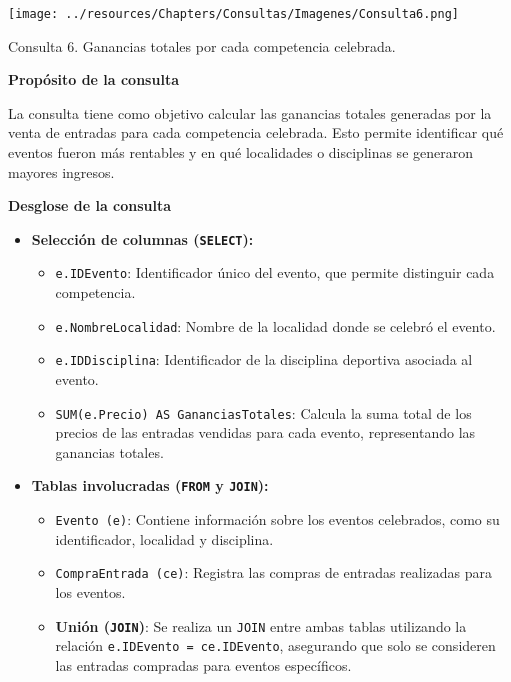 \begin{center}
    \texttt{[image: ../resources/Chapters/Consultas/Imagenes/Consulta6.png]} 
    
   Consulta 6. Ganancias totales por cada competencia celebrada.
\end{center}

\textbf{Propósito de la consulta}

La consulta tiene como objetivo calcular las ganancias totales generadas por la venta de entradas para cada competencia celebrada. Esto permite identificar qué eventos fueron más rentables y en qué localidades o disciplinas se generaron mayores ingresos.

\textbf{Desglose de la consulta}

\begin{itemize}
   \item \textbf{Selección de columnas (\texttt{SELECT}):}
   \begin{itemize}
       \item \texttt{e.IDEvento}: Identificador único del evento, que permite distinguir cada competencia.
       \item \texttt{e.NombreLocalidad}: Nombre de la localidad donde se celebró el evento.
       \item \texttt{e.IDDisciplina}: Identificador de la disciplina deportiva asociada al evento.
       \item \texttt{SUM(e.Precio) AS GananciasTotales}: Calcula la suma total de los precios de las entradas vendidas para cada evento, representando las ganancias totales.
   \end{itemize}

   \item \textbf{Tablas involucradas (\texttt{FROM} y \texttt{JOIN}):}
   \begin{itemize}
       \item \texttt{Evento (e)}: Contiene información sobre los eventos celebrados, como su identificador, localidad y disciplina.
       \item \texttt{CompraEntrada (ce)}: Registra las compras de entradas realizadas para los eventos.
       \item \textbf{Unión (\texttt{JOIN})}: Se realiza un \texttt{JOIN} entre ambas tablas utilizando la relación \texttt{e.IDEvento = ce.IDEvento}, asegurando que solo se consideren las entradas compradas para eventos específicos.
   \end{itemize}


\end{itemize}
